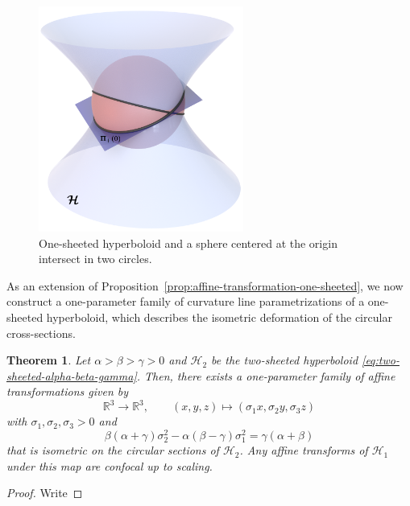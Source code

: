 \documentclass[10pt, a4paper]{article}
\theoremstyle{BoldTopSpacing}
\newtheorem{theorem}{Theorem}[section]
\theoremstyle{BoldTopSpacing}
\theoremstyle{BoldTopSpacing}
\theoremstyle{BoldTopBottomSpacing}
\theoremstyle{BoldTopSpacing}
\theoremstyle{BoldTopBottomSpacing}
\theoremstyle{remark}
\begin{document}
\begin{figure}[H]
    \centering
    \includegraphics[width=0.6\textwidth]{proof-one-sheeted-transformation.png}
    \caption{One-sheeted hyperboloid and a sphere centered at the origin intersect in two circles.}
    \label{fig:proof-one-sheeted-transformation}
\end{figure}

As an extension of Proposition~\ref{prop:affine-transformation-one-sheeted}, we now construct a one-parameter family of curvature line parametrizations of a one-sheeted hyperboloid, which describes the isometric deformation of the circular cross-sections.

\begin{theorem}
\label{thm:affine-transformation-two-hyperboloid}
Let $\alpha > \beta > \gamma > 0$ and $\mathcal{H}_{2}$ be the two-sheeted hyperboloid \eqref{eq:two-sheeted-alpha-beta-gamma}. Then, there exists a one-parameter family of affine transformations given by
\[
    \mathbb{R}^3 \to \mathbb{R}^3, \quad \quad (x, y, z) \mapsto (\sigma_{1}x, \sigma_{2}y, \sigma_{3}z)
\]
with $\sigma_{1}, \sigma_{2}, \sigma_{3} > 0$ and
\begin{equation}
    \beta (\alpha + \gamma) \sigma_{2}^2 - \alpha (\beta - \gamma) \sigma_{1}^2 = \gamma (\alpha + \beta)
\end{equation}
that is isometric on the circular sections of $\mathcal{H}_{2}$. Any affine transforms of $\mathcal{H}_1$ under this map are confocal up to scaling.
\end{theorem}
\begin{proof}
    Write
\end{proof}
\end{document}
